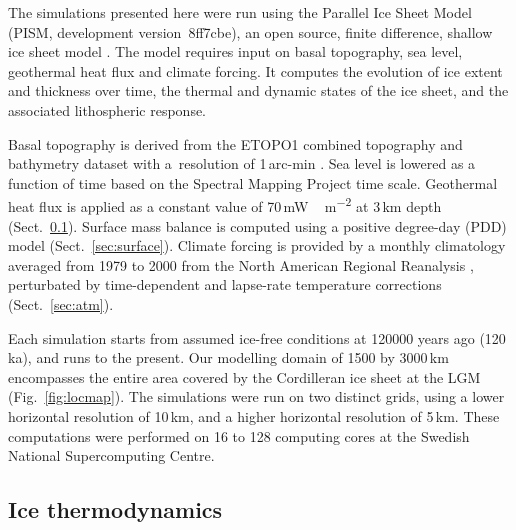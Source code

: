 \documentclass[tc]{copernicus}
\begin{document}
The simulations presented here were run using the Parallel Ice Sheet Model
(PISM, development version~8ff7cbe), an open source,
finite difference, shallow ice sheet model \citep{PISM-authors.2015}. The model
requires input on basal topography, sea level, geothermal heat flux and
climate forcing. It computes the evolution of ice extent
and thickness over time, the thermal and dynamic
states of the ice sheet, and the associated lithospheric response.

Basal topography is derived from the ETOPO1 combined topography and bathymetry
dataset with a~resolution of 1\,arc-min \citep{Amante.Eakins.2009}. Sea level
is lowered as a function of time based on the Spectral Mapping Project
\citep[SPECMAP,][]{Imbrie.etal.1989} time scale. Geothermal heat flux
is applied as a constant value of 70\,\unit{mW\,m^{-2}} at 3\,km depth
(Sect.~\ref{sec:icedyn}). Surface mass balance is computed using a positive
degree-day (PDD) model (Sect.~\ref{sec:surface}). Climate forcing is
provided by a monthly climatology averaged from 1979 to 2000 from the North
American Regional Reanalysis \citep[NARR,][]{Mesinger.etal.2006},
perturbated by time-dependent and
lapse-rate temperature corrections (Sect.~\ref{sec:atm}).

Each simulation starts from assumed ice-free conditions at 120000 years ago
(120\,ka), and runs to the present. Our modelling domain of 1500 by 3000\,km
encompasses the entire area covered by the Cordilleran ice sheet at the LGM
(Fig.~\ref{fig:locmap}). The simulations were run on two distinct grids, using
a lower horizontal resolution of 10\,km, and a higher horizontal resolution of
5\,km. These computations were performed on 16 to 128 computing cores at the
Swedish National Supercomputing Centre.

\subsection{Ice thermodynamics}
\label{sec:icedyn}
\end{document}

